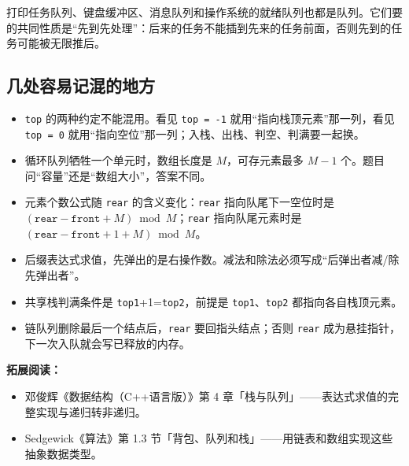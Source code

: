 打印任务队列、键盘缓冲区、消息队列和操作系统的就绪队列也都是队列。它们要的共同性质是“先到先处理”：后来的任务不能插到先来的任务前面，否则先到的任务可能被无限推后。

\subsection*{几处容易记混的地方}

\begin{itemize}
    \item \texttt{top} 的两种约定不能混用。看见 \texttt{top = -1} 就用“指向栈顶元素”那一列，看见 \texttt{top = 0} 就用“指向空位”那一列；入栈、出栈、判空、判满要一起换。
    \item 循环队列牺牲一个单元时，数组长度是 $M$，可存元素最多 $M-1$ 个。题目问“容量”还是“数组大小”，答案不同。
    \item 元素个数公式随 \texttt{rear} 的含义变化：\texttt{rear} 指向队尾下一空位时是 $(\texttt{rear}-\texttt{front}+M)\bmod M$；\texttt{rear} 指向队尾元素时是 $(\texttt{rear}-\texttt{front}+1+M)\bmod M$。
    \item 后缀表达式求值，先弹出的是右操作数。减法和除法必须写成“后弹出者减/除先弹出者”。
    \item 共享栈判满条件是 \texttt{top1}+1=\texttt{top2}，前提是 \texttt{top1}、\texttt{top2} 都指向各自栈顶元素。
    \item 链队列删除最后一个结点后，\texttt{rear} 要回指头结点；否则 \texttt{rear} 成为悬挂指针，下一次入队就会写已释放的内存。
\end{itemize}

\noindent\textbf{拓展阅读：}
\begin{itemize}
    \item 邓俊辉《数据结构（C++语言版）》第 4 章「栈与队列」——表达式求值的完整实现与递归转非递归。
    \item Sedgewick《算法》第 1.3 节「背包、队列和栈」——用链表和数组实现这些抽象数据类型。
\end{itemize}

\newpage

